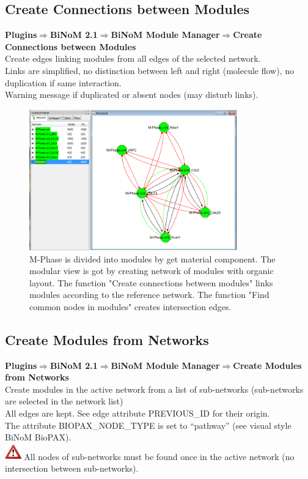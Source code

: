 \subsection{Create Connections between Modules}
\textbf{Plugins$\Rightarrow$BiNoM 2.1$\Rightarrow$BiNoM Module Manager$\Rightarrow$Create Connections between Modules}\\
Create edges linking modules from all edges of the selected network.\\
Links are simplified, no distinction between left and right (molecule flow), no duplication if same interaction.\\
Warning message if duplicated or absent nodes (may disturb links).
\begin{figure}
\centering
\includegraphics[width=0.8\textwidth]{graphics/M-Phase_Material_Modular}
\caption{M-Phase is divided into modules by get material component. The modular view is got by creating network of modules with organic layout. The function "Create connections between modules" links modules according to the reference network. The function "Find common nodes in modules" creates intersection edges. }
\label{M-Phase_Material_Modular}
\end{figure}

\subsection{Create Modules from Networks}
\textbf{Plugins$\Rightarrow$BiNoM 2.1$\Rightarrow$BiNoM Module Manager$\Rightarrow$Create Modules from Networks}\\
Create modules in the active network from a list of sub-networks (sub-networks are selected in the network list)\\
All edges are kept. See edge attribute PREVIOUS\_ID for their origin.\\
The attribute BIOPAX\_NODE\_TYPE is set to “pathway” (see visual style BiNoM BioPAX).\\
\includegraphics[width=20pt,height=20pt]{graphics/warning} All nodes of sub-networks must be found once in the active network (no intersection between sub-networks).

